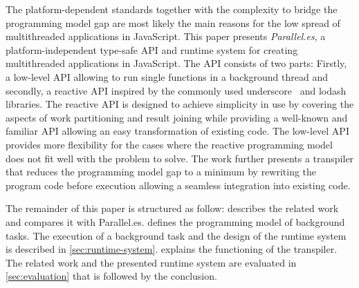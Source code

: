 The platform-dependent standards together with the complexity to bridge the programming model gap are most likely the main reasons for the low spread of multithreaded applications in JavaScript. This paper presents \textit{Parallel.es}, a platform-independent type-safe API and runtime system for creating multithreaded applications in JavaScript. The API consists of two parts: Firstly, a low-level API allowing to run single functions in a background thread and secondly, a reactive API inspired by the commonly used underscore~\cite{underscorejs} and lodash~\cite{lodash} libraries. The reactive API is designed to achieve simplicity in use by covering the aspects of work partitioning and result joining while providing a well-known and familiar API allowing an easy transformation of existing code. The low-level API provides more flexibility for the cases where the reactive programming model does not fit well with the problem to solve. The work further presents a transpiler that reduces the programming model gap to a minimum by rewriting the program code before execution allowing a seamless integration into existing code.

The remainder of this paper is structured as follow:  describes the related work and compares it with Parallel.es.  defines the programming model of background tasks. The execution of a background task and the design of the runtime system is described in \cref{sec:runtime-system}.  explains the functioning of the transpiler. The related work and the presented runtime system are evaluated in \cref{sec:evaluation} that is followed by the conclusion. 